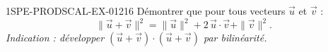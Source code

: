 \begin{exercice}{1SPE-PRODSCAL-EX-012}{1}{6}
Démontrer que pour tous vecteurs $\vec{u}$ et $\vec{v}$ :
\[
\|\vec{u} + \vec{v}\|^2 = \|\vec{u}\|^2 + 2\,\vec{u} \cdot \vec{v} + \|\vec{v}\|^2.
\]
\textit{Indication : développer $(\vec{u} + \vec{v}) \cdot (\vec{u} + \vec{v})$ par bilinéarité.}
\end{exercice}
